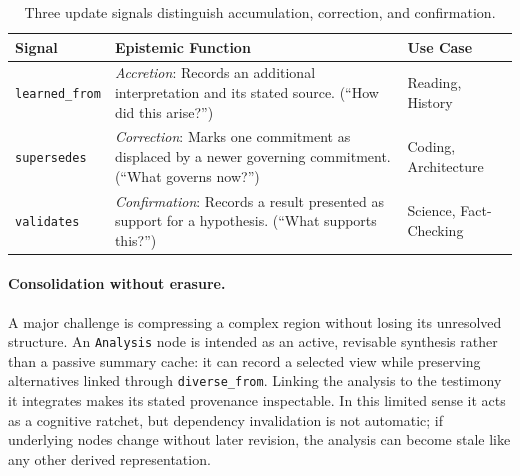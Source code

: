 \begin{table}[h]
\centering
\begin{tabularx}{\columnwidth}{lXl}
\toprule
\textbf{Signal} & \textbf{Epistemic Function} & \textbf{Use Case} \\
\midrule
\texttt{learned\_from} & \emph{Accretion}: Records an additional interpretation and its stated source. (``How did this arise?'') & Reading, History \\
\texttt{supersedes} & \emph{Correction}: Marks one commitment as displaced by a newer governing commitment. (``What governs now?'') & Coding, Architecture \\
\texttt{validates} & \emph{Confirmation}: Records a result presented as support for a hypothesis. (``What supports this?'') & Science, Fact-Checking \\
\bottomrule
\end{tabularx}
\caption{Three update signals distinguish accumulation, correction, and confirmation.}
\label{tab:update-signals}
\end{table}

\paragraph{Consolidation without erasure.} A major challenge is compressing a complex region without losing its unresolved structure. An \texttt{Analysis} node is intended as an active, revisable synthesis rather than a passive summary cache: it can record a selected view while preserving alternatives linked through \texttt{diverse\_from}. Linking the analysis to the testimony it integrates makes its stated provenance inspectable. In this limited sense it acts as a cognitive ratchet, but dependency invalidation is not automatic; if underlying nodes change without later revision, the analysis can become stale like any other derived representation.


